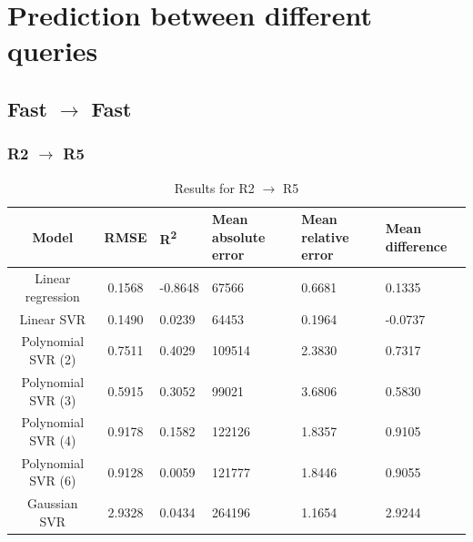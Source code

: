 \documentclass[a4paper,11pt]{article}
\begin{document}
\newpage
\section{Prediction between different queries}
\subsection{Fast $\rightarrow$ Fast}
\subsubsection{R2 $\rightarrow$ R5}
\begin{table}[H]
	\centering
	\begin{adjustbox}{center}
		\begin{tabular}{c | c M{1.2cm} M{2.5cm} M{2.5cm} M{1.8cm}}
			Model & RMSE & R\textsuperscript{2} & Mean absolute error & Mean relative error & Mean difference \tabularnewline
			\hline
			Linear regression & 0.1568 & -0.8648 &  67566 & 0.6681 & 0.1335 \\
			Linear SVR & 0.1490 & 0.0239 &  64453 & 0.1964 & -0.0737 \\
			Polynomial SVR (2) & 0.7511 & 0.4029 & 109514 & 2.3830 & 0.7317 \\
			Polynomial SVR (3) & 0.5915 & 0.3052 &  99021 & 3.6806 & 0.5830 \\
			Polynomial SVR (4) & 0.9178 & 0.1582 & 122126 & 1.8357 & 0.9105 \\
			Polynomial SVR (6) & 0.9128 & 0.0059 & 121777 & 1.8446 & 0.9055 \\
			Gaussian SVR & 2.9328 & 0.0434 & 264196 & 1.1654 & 2.9244 \\
		\end{tabular}
	\end{adjustbox}
	\\
	\caption{Results for R2 $\rightarrow$ R5 }
	\label{fig:query_comp_001}
\end{table}
\end{document}
